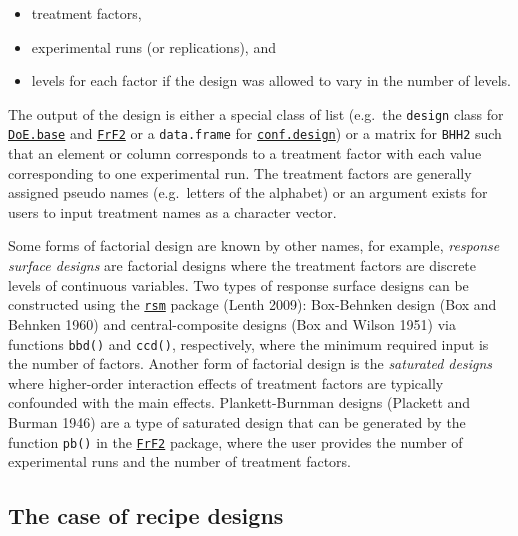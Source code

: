 \documentclass{article}
\providecommand{\tightlist}{%
  \setlength{\itemsep}{0pt}\setlength{\parskip}{0pt}}
\def\tightlist{}
\begin{document}
\begin{itemize}
\tightlist
\item
  treatment factors,
\item
  experimental runs (or replications), and
\item
  levels for each factor if the design was allowed to vary in the number
  of levels.
\end{itemize}

The output of the design is either a special class of list (e.g.~the
\texttt{design} class for
\href{https://cran.r-project.org/web/packages/DoE.base/index.html}{\texttt{DoE.base}}
and
\href{https://cran.r-project.org/web/packages/FrF2/index.html}{\texttt{FrF2}}
or a \texttt{data.frame} for
\href{https://cran.r-project.org/web/packages/conf.design/index.html}{\texttt{conf.design}})
or a matrix for \texttt{BHH2} such that an element or column corresponds
to a treatment factor with each value corresponding to one experimental
run. The treatment factors are generally assigned pseudo names
(e.g.~letters of the alphabet) or an argument exists for users to input
treatment names as a character vector.

Some forms of factorial design are known by other names, for example,
\emph{response surface designs} are factorial designs where the
treatment factors are discrete levels of continuous variables. Two types
of response surface designs can be constructed using the
\href{https://cran.r-project.org/web/packages/rsm/index.html}{\texttt{rsm}}
package (Lenth 2009): Box-Behnken design (Box and Behnken 1960) and
central-composite designs (Box and Wilson 1951) via functions
\texttt{bbd()} and \texttt{ccd()}, respectively, where the minimum
required input is the number of factors. Another form of factorial
design is the \emph{saturated designs} where higher-order interaction
effects of treatment factors are typically confounded with the main
effects. Plankett-Burnman designs (Plackett and Burman 1946) are a type
of saturated design that can be generated by the function \texttt{pb()}
in the
\href{https://cran.r-project.org/web/packages/FrF2/index.html}{\texttt{FrF2}}
package, where the user provides the number of experimental runs and the
number of treatment factors.

\hypertarget{the-case-of-recipe-designs}{%
\subsection{The case of recipe
designs}\label{the-case-of-recipe-designs}}
\end{document}
